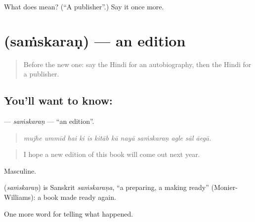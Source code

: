 \begin{tcolorbox}[breakable,colback=teal!4,colframe=teal!35!black,title={Before you move on}]
What does  mean? (\textquotedblleft{}A publisher\textquotedblright{}.) Say it once more.
\end{tcolorbox}
\section[\texorpdfstring{\hi{संस्करण} (saṁskaraṇ)}{संस्करण (saṁskaraṇ)}]{ (saṁskaraṇ) — an edition}

\label{lesson:HI-C342-samskaran}



\begin{quote}
Before the new one: say the Hindi for an autobiography, then the Hindi for a publisher.
\end{quote}

\subsection*{You'll want to know: }
\textbf{} — \emph{saṁskaraṇ} — \textquotedblleft{}an edition\textquotedblright{}.

\begin{quote}
           
\end{quote}

\begin{quote}
\emph{mujhe ummīd hai ki is kitāb kā nayā saṁskaraṇ agle sāl āegā.}
\end{quote}

\begin{quote}
I hope a new edition of this book will come out next year.
\end{quote}

Masculine.

\begin{cousinweb}
\textbf{} (\emph{saṁskaraṇ}) is Sanskrit \emph{saṁskaraṇa}, \textquotedblleft{}a preparing, a making ready\textquotedblright{} (Monier-Williams): a book made ready again.
\end{cousinweb}

\begin{grammarlens}[title={What you've built}]
One more word for telling what happened.
\end{grammarlens}

